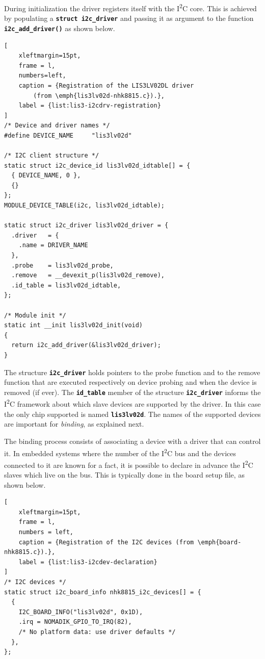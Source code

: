 \documentclass[a4paper,10pt]{article}
\newcommand{\icc}{I\textsuperscript{2}C }
\newcommand{\keyword}[1]{\texttt{\textbf{#1}}}
\begin{document}
\begin{multicols}{2}
During initialization the driver registers itself with the \icc core. This
is achieved by populating a \keyword{struct i2c\_driver} and passing it
as argument to the function \keyword{i2c\_add\_driver()} as shown below.

\begin{lstlisting}[
	xleftmargin=15pt,
	frame = l,
	numbers=left,
	caption = {Registration of the LIS3LV02DL driver
		(from \emph{lis3lv02d-nhk8815.c}).},
	label = {list:lis3-i2cdrv-registration}
]
/* Device and driver names */
#define	DEVICE_NAME		"lis3lv02d"

/* I2C client structure */
static struct i2c_device_id lis3lv02d_idtable[] = {
  { DEVICE_NAME, 0 },
  {}
};
MODULE_DEVICE_TABLE(i2c, lis3lv02d_idtable);

static struct i2c_driver lis3lv02d_driver = {
  .driver   = {
    .name = DRIVER_NAME
  },
  .probe    = lis3lv02d_probe,
  .remove   = __devexit_p(lis3lv02d_remove),
  .id_table = lis3lv02d_idtable,
};

/* Module init */
static int __init lis3lv02d_init(void)
{
  return i2c_add_driver(&lis3lv02d_driver);
}
\end{lstlisting}

The structure \keyword{i2c\_driver} holds pointers to the probe function
and to the remove function that are executed respectively on device probing
and when the device is removed (if ever).
The \keyword{id\_table} member of the structure \keyword{i2c\_driver} informs
the \icc framework about which slave devices are supported by the driver.
In this case the only chip supported is named \keyword{lis3lv02d}.
The names of the supported devices are important for \emph{binding}, as
explained next.

The binding process consists of associating a device with a driver that can
control it. In embedded systems where the number of the \icc bus and the
devices connected to it are known for a fact, it is possible to declare in
advance the \icc slaves which live on the bus. This is typically done in the
board setup file, as shown below.

\begin{lstlisting}[
	xleftmargin=15pt,
	frame = l,
	numbers = left,
	caption = {Registration of the I2C devices (from \emph{board-nhk8815.c}).},
	label = {list:lis3-i2cdev-declaration}
]
/* I2C devices */
static struct i2c_board_info nhk8815_i2c_devices[] = {
  {
    I2C_BOARD_INFO("lis3lv02d", 0x1D),
    .irq = NOMADIK_GPIO_TO_IRQ(82),
    /* No platform data: use driver defaults */
  },
};


\end{lstlisting}
\end{multicols}
\end{document}
